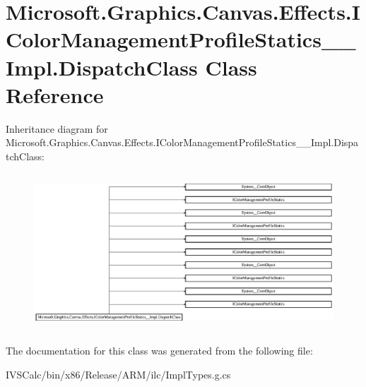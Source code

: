 \hypertarget{class_microsoft_1_1_graphics_1_1_canvas_1_1_effects_1_1_i_color_management_profile_statics_____impl_1_1_dispatch_class}{}\section{Microsoft.\+Graphics.\+Canvas.\+Effects.\+I\+Color\+Management\+Profile\+Statics\+\_\+\+\_\+\+Impl.\+Dispatch\+Class Class Reference}
\label{class_microsoft_1_1_graphics_1_1_canvas_1_1_effects_1_1_i_color_management_profile_statics_____impl_1_1_dispatch_class}
Inheritance diagram for Microsoft.\+Graphics.\+Canvas.\+Effects.\+I\+Color\+Management\+Profile\+Statics\+\_\+\+\_\+\+Impl.\+Dispatch\+Class\+:\begin{figure}[H]
\begin{center}
\leavevmode
\includegraphics[height=5.900383cm]{class_microsoft_1_1_graphics_1_1_canvas_1_1_effects_1_1_i_color_management_profile_statics_____impl_1_1_dispatch_class}
\end{center}
\end{figure}


The documentation for this class was generated from the following file\+:\begin{DoxyCompactItemize}
\item 
I\+V\+S\+Calc/bin/x86/\+Release/\+A\+R\+M/ilc/Impl\+Types.\+g.\+cs\end{DoxyCompactItemize}
